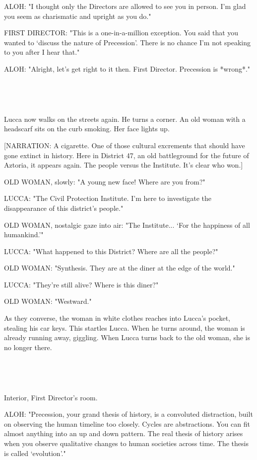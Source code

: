 \documentclass[11pt]{article}
\begin{document}
ALOH: "I thought only the Directors are allowed to see you in person.
I'm glad you seem as charismatic and upright as you do."

FIRST DIRECTOR: "This is a one-in-a-million exception.
You said that you wanted to `discuss the nature of Precession'. 
There is no chance I'm not speaking to you after I hear that."

ALOH: "Alright, let's get right to it then. 
First Director. 
Precession is *wrong*."

\ 

\ 

Lucca now walks on the streets again.
He turns a corner.
An old woman with a headscarf sits on the curb smoking.
Her face lights up.

[NARRATION: A cigarette. 
One of those cultural excrements that should have gone extinct in history.
Here in District 47, an old battleground for the future of Aztoria, it appears again.
The people versus the Institute. 
It's clear who won.]

OLD WOMAN, slowly: "A young new face! Where are you from?"

LUCCA: "The Civil Protection Institute. I'm here to investigate the disappearance of this district's people."

OLD WOMAN, nostalgic gaze into air: "The Institute...
`For the happiness of all humankind.'"

LUCCA: "What happened to this District?
Where are all the people?"

OLD WOMAN: "Synthesis.
They are at the diner at the edge of the world."

LUCCA: "They're still alive? Where is this diner?"

OLD WOMAN: "Westward."

As they converse, the woman in white clothes reaches into Lucca's pocket, stealing his car keys. 
This startles Lucca.
When he turns around, the woman is already running away, giggling.
When Lucca turns back to the old woman, she is no longer there.

\ 

\ 

Interior, First Director's room.

ALOH: "Precession, your grand thesis of history, is a convoluted distraction, built on observing the human timeline too closely.
Cycles are abstractions. You can fit almost anything into an up and down pattern.
The real thesis of history arises when you observe qualitative changes to human societies across time.
The thesis is called `evolution'."
\end{document}
